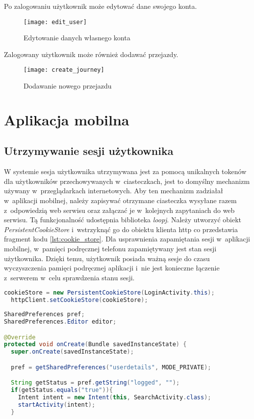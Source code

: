 \documentclass[eng,archivemode]{mgr}
\begin{document}
Po zalogowaniu użytkownik może edytować dane swojego konta.
\begin{figure}[H]
	\centering
	\texttt{[image: edit\_user]}
	\caption{Edytowanie danych własnego konta}
	\label{fig:edit_user}
\end{figure}
\newpage
Zalogowany użytkownik może również dodawać przejazdy.

\begin{figure}[H]
	\centering
	\texttt{[image: create\_journey]}
	\caption{Dodawanie nowego przejazdu}
	\label{fig:create_journey}
\end{figure}

\section{Aplikacja mobilna}

\subsection{Utrzymywanie sesji użytkownika}
W systemie sesja użytkownika utrzymywana jest za pomocą unikalnych tokenów dla użytkowników przechowywanych w~ciasteczkach, jest to domyślny mechanizm używany w~przeglądarkach internetowych. Aby ten mechanizm zadziałał w~aplikacji mobilnej, należy zapisywać otrzymane ciasteczka wysyłane razem z~odpowiedzią web serwisu oraz załączać je w~kolejnych zapytaniach do web serwisu. Tą funkcjonalność udostępnia biblioteka \textit{loopj}. Należy utworzyć obiekt \textit{PersistentCookieStore} i~wstrzyknąć go do obiektu klienta http co przedstawia fragment kodu \ref{lst:cookie_store}. Dla usprawnienia zapamiętania sesji w~aplikacji mobilnej, w~pamięci podręcznej telefonu zapamiętywany jest stan sesji użytkownika. Dzięki temu, użytkownik posiada ważną sesje do czasu wyczyszczenia pamięci podręcznej aplikacji i~nie jest konieczne łączenie z~serwerem w~celu sprawdzenia stanu sesji.

\begin{lstlisting}[language=java, caption={Automatyczna obsługa ciasteczek}, label=lst:cookie_store]
  cookieStore = new PersistentCookieStore(LoginActivity.this);
  httpClient.setCookieStore(cookieStore);
\end{lstlisting}

\begin{lstlisting}[language=java, caption={Sprawdzenie czy użytkownik posiada aktywną sesje poprzez odczyt zmiennej "logged" przechowywanej w~pamięci telefonu}]
SharedPreferences pref;
SharedPreferences.Editor editor;

@Override
protected void onCreate(Bundle savedInstanceState) {
  super.onCreate(savedInstanceState);

  pref = getSharedPreferences("userdetails", MODE_PRIVATE);

  String getStatus = pref.getString("logged", "");
  if(getStatus.equals("true")){
    Intent intent = new Intent(this, SearchActivity.class);
    startActivity(intent);
  }
\end{lstlisting}
\end{document}

